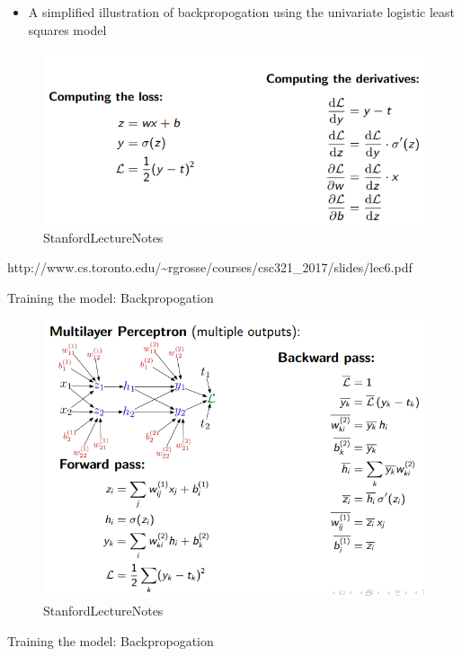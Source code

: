 \documentclass[11pt]{article}
\makeatletter
\def\maxwidth{\ifdim\Gin@nat@width>\linewidth\linewidth
    \else\Gin@nat@width\fi}
\let\Oldincludegraphics\includegraphics
\renewcommand{\includegraphics}[1]{\Oldincludegraphics[width=.8\maxwidth]{#1}}
\providecommand{\tightlist}{%
      \setlength{\itemsep}{0pt}\setlength{\parskip}{0pt}}
\makeatother
\begin{document}
\begin{itemize}
\tightlist
\item
  A simplified illustration of backpropogation using the univariate
  logistic least squares model
\end{itemize}

\begin{figure}
\centering
\includegraphics{pres_imgs/back_prop_simple.png}
\caption{StanfordLectureNotes}
\end{figure}

http://www.cs.toronto.edu/\textasciitilde{}rgrosse/courses/csc321\_2017/slides/lec6.pdf

    Training the model: Backpropogation

\begin{figure}
\centering
\includegraphics{pres_imgs/back_prop_mlpc.png}
\caption{StanfordLectureNotes}
\end{figure}

    Training the model: Backpropogation
\end{document}

